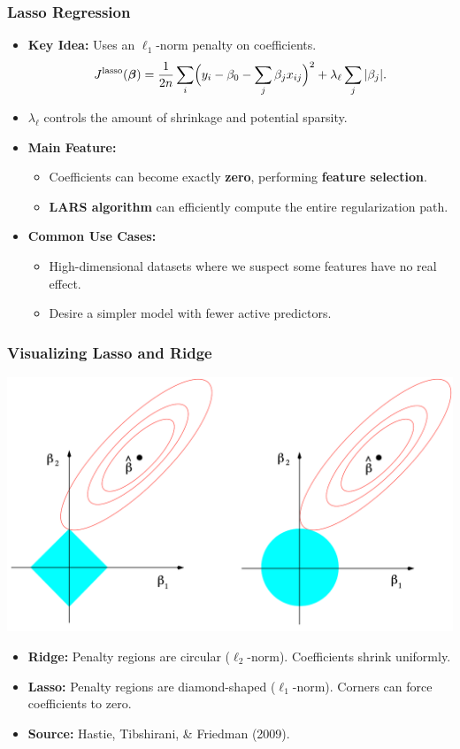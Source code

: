 \documentclass[aspectratio=169]{beamer}
\begin{document}
\begin{frame}
    \frametitle{Lasso Regression}
    \begin{itemize}
        \item \textbf{Key Idea:} Uses an \(\ell_1\)-norm penalty on coefficients.
        \[
            J^{\text{lasso}}(\boldsymbol{\beta}) 
            = \frac{1}{2n}\sum_{i}\Bigl(y_i - \beta_0 - \sum_{j}\beta_j x_{ij}\Bigr)^2 
            + \lambda_\ell \sum_{j}|\beta_j|.
        \]
        \item \(\lambda_\ell\) controls the amount of shrinkage and potential sparsity.
        \item \textbf{Main Feature:}
        \begin{itemize}
            \item Coefficients can become exactly \textbf{zero}, performing \textbf{feature selection}.
            \item \textbf{LARS algorithm} can efficiently compute the entire regularization path.
        \end{itemize}
        \item \textbf{Common Use Cases:}
        \begin{itemize}
            \item High-dimensional datasets where we suspect some features have no real effect.
            \item Desire a simpler model with fewer active predictors.
        \end{itemize}
    \end{itemize}
\end{frame}

\begin{frame}
    \frametitle{Visualizing Lasso and Ridge}
    \begin{center}
        \includegraphics[scale=0.23]{figures/Estimation_picture.png}
    \end{center}
    \begin{itemize}
        \item \textbf{Ridge:} Penalty regions are circular (\(\ell_2\)-norm). Coefficients shrink uniformly.
        \item \textbf{Lasso:} Penalty regions are diamond-shaped (\(\ell_1\)-norm). Corners can force coefficients to zero.
        \item \textbf{Source:} Hastie, Tibshirani, \& Friedman (2009).
    \end{itemize}
\end{frame}
\end{document}
